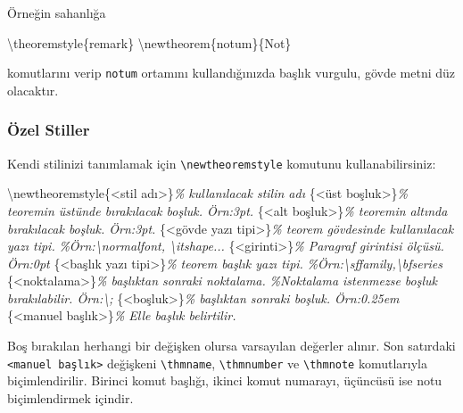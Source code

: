 \documentclass[
  10pt,
]{scrbook}
\newenvironment{Shaded}{}{}
\newcommand{\CommentTok}[1]{\textcolor[rgb]{0.38,0.63,0.69}{\textit{#1}}}
\newcommand{\FunctionTok}[1]{\textcolor[rgb]{0.02,0.16,0.49}{#1}}
\newcommand{\NormalTok}[1]{#1}
\theoremstyle{definition}
\theoremstyle{definition}
\theoremstyle{definition}
\theoremstyle{definition}
\theoremstyle{remark}
\begin{document}
Örneğin sahanlığa

\begin{Shaded}
\begin{Highlighting}[]
\FunctionTok{\textbackslash{}theoremstyle}\NormalTok{\{remark\}}
\FunctionTok{\textbackslash{}newtheorem}\NormalTok{\{notum\}\{Not\}}
\end{Highlighting}
\end{Shaded}

komutlarını verip \texttt{notum} ortamını kullandığınızda başlık vurgulu, gövde metni düz olacaktır.

\hypertarget{uxf6zel-stiller}{%
\subsubsection{Özel Stiller}\label{uxf6zel-stiller}}

Kendi stilinizi tanımlamak için \texttt{\textbackslash{}newtheoremstyle} komutunu kullanabilirsiniz:

\begin{Shaded}
\begin{Highlighting}[]
\FunctionTok{\textbackslash{}newtheoremstyle}\NormalTok{\{\textless{}stil adı\textgreater{}\}}\CommentTok{\% kullanılacak stilin adı}
\NormalTok{\{\textless{}üst boşluk\textgreater{}\}}\CommentTok{\% teoremin üstünde bırakılacak boşluk. Örn:3pt.}
\NormalTok{\{\textless{}alt boşluk\textgreater{}\}}\CommentTok{\% teoremin altında bırakılacak boşluk. Örn:3pt.}
\NormalTok{\{\textless{}gövde yazı tipi\textgreater{}\}}\CommentTok{\% teorem gövdesinde kullanılacak yazı tipi.}
 \CommentTok{\%Örn:\textbackslash{}normalfont, \textbackslash{}itshape...}
\NormalTok{\{\textless{}girinti\textgreater{}\}}\CommentTok{\% Paragraf girintisi ölçüsü. Örn:0pt}
\NormalTok{\{\textless{}başlık yazı tipi\textgreater{}\}}\CommentTok{\% teorem başlık yazı tipi.}
 \CommentTok{\%Örn:\textbackslash{}sffamily,\textbackslash{}bfseries}
\NormalTok{\{\textless{}noktalama\textgreater{}\}}\CommentTok{\% başlıktan sonraki noktalama.}
 \CommentTok{\%Noktalama istenmezse boşluk bırakılabilir. Örn:\textbackslash{}; }
\NormalTok{\{\textless{}boşluk\textgreater{}\}}\CommentTok{\% başlıktan sonraki boşluk. Örn:0.25em}
\NormalTok{\{\textless{}manuel başlık\textgreater{}\}}\CommentTok{\% Elle başlık belirtilir.}
\end{Highlighting}
\end{Shaded}

Boş bırakılan herhangi bir değişken olursa varsayılan değerler alınır. Son satırdaki \texttt{\textless{}manuel\ başlık\textgreater{}} değişkeni \texttt{\textbackslash{}thmname}, \texttt{\textbackslash{}thmnumber} ve \texttt{\textbackslash{}thmnote} komutlarıyla biçimlendirilir. Birinci komut başlığı, ikinci komut numarayı, üçüncüsü ise notu biçimlendirmek içindir.
\end{document}
